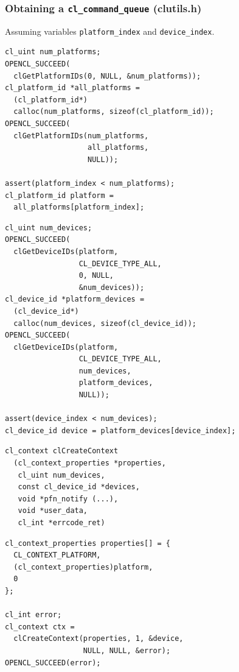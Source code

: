 \documentclass{beamer}
\begin{document}
\begin{frame}[fragile]
  \frametitle{Obtaining a \texttt{cl\_command\_queue} (clutils.h)}

Assuming variables \texttt{platform\_index} and \texttt{device\_index}.

\begin{lstlisting}
cl_uint num_platforms;
OPENCL_SUCCEED(
  clGetPlatformIDs(0, NULL, &num_platforms));
cl_platform_id *all_platforms =
  (cl_platform_id*)
  calloc(num_platforms, sizeof(cl_platform_id));
OPENCL_SUCCEED(
  clGetPlatformIDs(num_platforms,
                   all_platforms,
                   NULL));

assert(platform_index < num_platforms);
cl_platform_id platform =
  all_platforms[platform_index];
\end{lstlisting}

\end{frame}

\begin{frame}[fragile]
\begin{lstlisting}
cl_uint num_devices;
OPENCL_SUCCEED(
  clGetDeviceIDs(platform,
                 CL_DEVICE_TYPE_ALL,
                 0, NULL,
                 &num_devices));
cl_device_id *platform_devices =
  (cl_device_id*)
  calloc(num_devices, sizeof(cl_device_id));
OPENCL_SUCCEED(
  clGetDeviceIDs(platform,
                 CL_DEVICE_TYPE_ALL,
                 num_devices,
                 platform_devices,
                 NULL));

assert(device_index < num_devices);
cl_device_id device = platform_devices[device_index];
\end{lstlisting}
\end{frame}

\begin{frame}[fragile]

\begin{lstlisting}[backgroundcolor=\color{lightgray}]
cl_context clCreateContext
  (cl_context_properties *properties,
   cl_uint num_devices,
   const cl_device_id *devices,
   void *pfn_notify (...),
   void *user_data,
   cl_int *errcode_ret)
\end{lstlisting}

\begin{lstlisting}
cl_context_properties properties[] = {
  CL_CONTEXT_PLATFORM,
  (cl_context_properties)platform,
  0
};

cl_int error;
cl_context ctx =
  clCreateContext(properties, 1, &device,
                  NULL, NULL, &error);
OPENCL_SUCCEED(error);
\end{lstlisting}
\end{frame}
\end{document}
